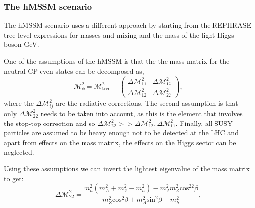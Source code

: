\subsubsection{The hMSSM scenario}
\label{sec:theory_BSM_models_hMSSM}
The hMSSM scenario \cite{hMSSM-1,hMSSM-2} uses a different approach by starting from 
the REPHRASE tree-level expressions for masses and mixing and
the mass of the light Higgs boson  GeV.

One of the assumptions of the hMSSM is that the
the mass matrix for the neutral CP-even states can
be decomposed as,
\begin{equation}
\label{eqn:hmssm_massmatrix}
\mathcal{M}^2_{\phi} = \mathcal{M}^2_{\text{tree}} + \begin{pmatrix}
\Delta\mathcal{M}^2_{11} & \Delta\mathcal{M}^2_{12} \\
\Delta\mathcal{M}^2_{12} & \Delta\mathcal{M}^2_{22} \end{pmatrix},
\end{equation}
where the $\Delta\mathcal{M}^2_{ij}$ are the radiative corrections.
The second assumption is that only $\Delta\mathcal{M}^2_{22}$ needs to be
taken into account, as this is the element that involves the stop-top correction
and so $\Delta\mathcal{M}^2_{22} >> \Delta\mathcal{M}^2_{12},\Delta\mathcal{M}^2_{11}$. 
Finally, all SUSY particles are assumed to be heavy enough not to be
detected at the \acs{LHC} and apart from effects on the mass matrix, 
the effects on the Higgs sector can be neglected.

Using these assumptions we can invert the lightest eigenvalue
of the mass matrix to get: 
\begin{equation}
\label{eqn:hmssm_deltam22}
\Delta\mathcal{M}^2_{22} = \frac{m_h^2(m_A^2+m_Z^2 - m_h^2) - m_A^2m_Z^2\text{cos}^22\beta}{m_Z^2\text{cos}^2\beta + m_A^2\text{sin}^2\beta - m_h^2},
\end{equation}

